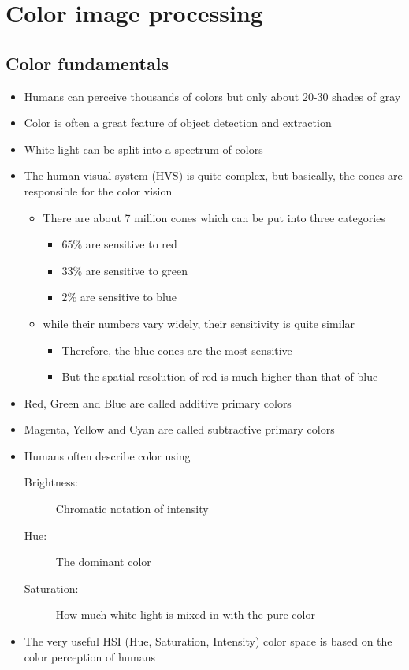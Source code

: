 \newpage
\section{Color image processing }
\subsection{Color fundamentals }
\begin{itemize}
	\item Humans can perceive thousands of colors but only about 20-30 shades of gray
	\item Color is often a great feature of object detection and extraction
	\item White light can be split into a spectrum of colors
	\item The human visual system (HVS) is quite complex, but basically, the cones are responsible for the color vision
	\begin{itemize}
		\item There are about 7 million cones which can be put into three categories
		\begin{itemize}
			\item $65\% $ are sensitive to red
			\item $33\% $ are sensitive to green
			\item $2\% $ are sensitive to blue
		\end{itemize}
		\item while their numbers vary widely, their sensitivity is quite similar
		\begin{itemize}
			\item Therefore, the blue cones are the most sensitive
			\item But the spatial resolution of red is much higher than that of blue
		\end{itemize}
	\end{itemize}
	\item Red, Green and Blue are called additive primary colors
	\item Magenta, Yellow and Cyan are called subtractive primary colors
	\item Humans often describe color using
	\begin{description}
		\item[Brightness:] Chromatic notation of intensity
		\item[Hue:] The dominant color
		\item[Saturation:] How much white light is mixed in with the pure color
	\end{description}
	\item The very useful HSI (Hue, Saturation, Intensity) color space is based on the color perception of humans	
\end{itemize}

